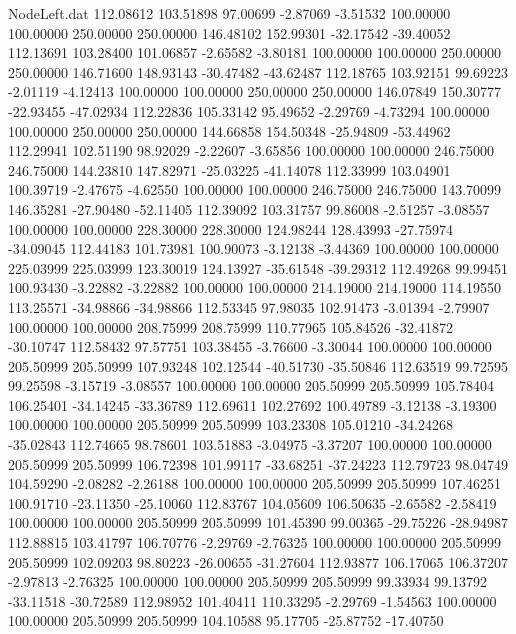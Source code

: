 \begin{filecontents}{NodeLeft.dat}
 112.08612  103.51898   97.00699    -2.87069   -3.51532  100.00000  100.00000  250.00000  250.00000  146.48102  152.99301  -32.17542  -39.40052
 112.13691  103.28400  101.06857    -2.65582   -3.80181  100.00000  100.00000  250.00000  250.00000  146.71600  148.93143  -30.47482  -43.62487
 112.18765  103.92151   99.69223    -2.01119   -4.12413  100.00000  100.00000  250.00000  250.00000  146.07849  150.30777  -22.93455  -47.02934
 112.22836  105.33142   95.49652    -2.29769   -4.73294  100.00000  100.00000  250.00000  250.00000  144.66858  154.50348  -25.94809  -53.44962
 112.29941  102.51190   98.92029    -2.22607   -3.65856  100.00000  100.00000  246.75000  246.75000  144.23810  147.82971  -25.03225  -41.14078
 112.33999  103.04901  100.39719    -2.47675   -4.62550  100.00000  100.00000  246.75000  246.75000  143.70099  146.35281  -27.90480  -52.11405
 112.39092  103.31757   99.86008    -2.51257   -3.08557  100.00000  100.00000  228.30000  228.30000  124.98244  128.43993  -27.75974  -34.09045
 112.44183  101.73981  100.90073    -3.12138   -3.44369  100.00000  100.00000  225.03999  225.03999  123.30019  124.13927  -35.61548  -39.29312
 112.49268   99.99451  100.93430    -3.22882   -3.22882  100.00000  100.00000  214.19000  214.19000  114.19550  113.25571  -34.98866  -34.98866
 112.53345   97.98035  102.91473    -3.01394   -2.79907  100.00000  100.00000  208.75999  208.75999  110.77965  105.84526  -32.41872  -30.10747
 112.58432   97.57751  103.38455    -3.76600   -3.30044  100.00000  100.00000  205.50999  205.50999  107.93248  102.12544  -40.51730  -35.50846
 112.63519   99.72595   99.25598    -3.15719   -3.08557  100.00000  100.00000  205.50999  205.50999  105.78404  106.25401  -34.14245  -33.36789
 112.69611  102.27692  100.49789    -3.12138   -3.19300  100.00000  100.00000  205.50999  205.50999  103.23308  105.01210  -34.24268  -35.02843
 112.74665   98.78601  103.51883    -3.04975   -3.37207  100.00000  100.00000  205.50999  205.50999  106.72398  101.99117  -33.68251  -37.24223
 112.79723   98.04749  104.59290    -2.08282   -2.26188  100.00000  100.00000  205.50999  205.50999  107.46251  100.91710  -23.11350  -25.10060
 112.83767  104.05609  106.50635    -2.65582   -2.58419  100.00000  100.00000  205.50999  205.50999  101.45390   99.00365  -29.75226  -28.94987
 112.88815  103.41797  106.70776    -2.29769   -2.76325  100.00000  100.00000  205.50999  205.50999  102.09203   98.80223  -26.00655  -31.27604
 112.93877  106.17065  106.37207    -2.97813   -2.76325  100.00000  100.00000  205.50999  205.50999   99.33934   99.13792  -33.11518  -30.72589
 112.98952  101.40411  110.33295    -2.29769   -1.54563  100.00000  100.00000  205.50999  205.50999  104.10588   95.17705  -25.87752  -17.40750

\end{filecontents}
